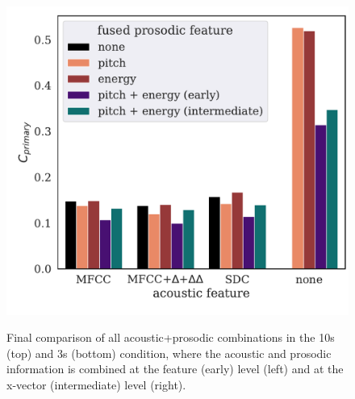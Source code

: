 \documentclass[bsc,frontabs,twoside,singlespacing,parskip,deptreport]{infthesis}
\begin{document}
{{\begin{figure}[h!t]
\begin{minipage}{0.49\textwidth}
        \label{fig:summary-early-3s}
      \end{minipage}
      \begin{minipage}{0.49\textwidth}
        \centering
        \vspace*{1.5em} 
        \includegraphics[width=\textwidth]{../img/summary-intermediate-3s.pdf}
        \label{fig:summary-intermediate-3s}
      \end{minipage}
      \caption{Final comparison of all acoustic+prosodic combinations in the 10s (top) and 3s (bottom) condition, where the acoustic and prosodic information is combined at the feature (early) level (left) and at the x-vector (intermediate) level (right).}
      \label{fig:summary-barplots}
    \end{figure}


}}
\end{document}
